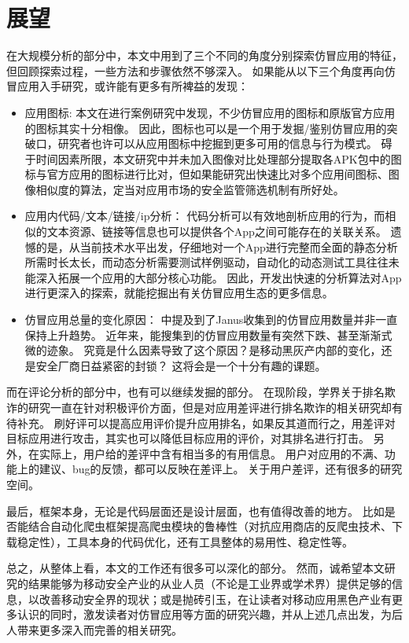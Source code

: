 \section{展望}

在大规模分析的部分中，本文中用到了三个不同的角度分别探索仿冒应用的特征，但回顾探索过程，一些方法和步骤依然不够深入。
如果能从以下三个角度再向仿冒应用入手研究，或许能有更多有所裨益的发现：

\begin{itemize}
    \item 应用图标:
    本文在进行案例研究中发现，不少仿冒应用的图标和原版官方应用的图标其实十分相像。
    因此，图标也可以是一个用于发掘/鉴别仿冒应用的突破口，研究者也许可以从应用图标中挖掘到更多可用的信息与行为模式。
    碍于时间因素所限，本文研究中并未加入图像对比处理部分提取各APK包中的图标与官方应用的图标进行比对，但如果能研究出快速比对多个应用间图标、图像相似度的算法，定当对应用市场的安全监管筛选机制有所好处。

    \item 应用内代码/文本/链接/ip分析：
    代码分析可以有效地剖析应用的行为，而相似的文本资源、链接等信息也可以提供各个App之间可能存在的关联关系。
    遗憾的是，从当前技术水平出发，仔细地对一个App进行完整而全面的静态分析所需时长太长，而动态分析需要测试样例驱动，自动化的动态测试工具往往未能深入拓展一个应用的大部分核心功能。
    因此，开发出快速的分析算法对App进行更深入的探索，就能挖掘出有关仿冒应用生态的更多信息。

    \item 仿冒应用总量的变化原因：
    中提及到了Janus收集到的仿冒应用数量并非一直保持上升趋势。
    近年来，能搜集到的仿冒应用数量有突然下跌、甚至渐渐式微的迹象。
    究竟是什么因素导致了这个原因？是移动黑灰产内部的变化，还是安全厂商日益紧密的封锁？
    这将会是一个十分有趣的课题。
\end{itemize}

而在评论分析的部分中，也有可以继续发掘的部分。
在现阶段，学界关于排名欺诈的研究一直在针对积极评价方面，但是对应用差评进行排名欺诈的相关研究却有待补充。
刷好评可以提高应用评价提升应用排名，如果反其道而行之，用差评对目标应用进行攻击，其实也可以降低目标应用的评价，对其排名进行打击。
另外，在实际上，用户给的差评中含有相当多的有用信息。
用户对应用的不满、功能上的建议、bug的反馈，都可以反映在差评上。
关于用户差评，还有很多的研究空间。

最后，\mytool 框架本身，无论是代码层面还是设计层面，也有值得改善的地方。
比如是否能结合自动化爬虫框架提高爬虫模块的鲁棒性（对抗应用商店的反爬虫技术、下载稳定性），工具本身的代码优化，还有工具整体的易用性、稳定性等。

总之，从整体上看，本文的工作还有很多可以深化的部分。
然而，诚希望本文研究的结果能够为移动安全产业的从业人员（不论是工业界或学术界）提供足够的信息，以改善移动安全界的现状；或是抛砖引玉，在让读者对移动应用黑色产业有更多认识的同时，激发读者对仿冒应用等方面的研究兴趣，并从上述几点出发，为后人带来更多深入而完善的相关研究。
